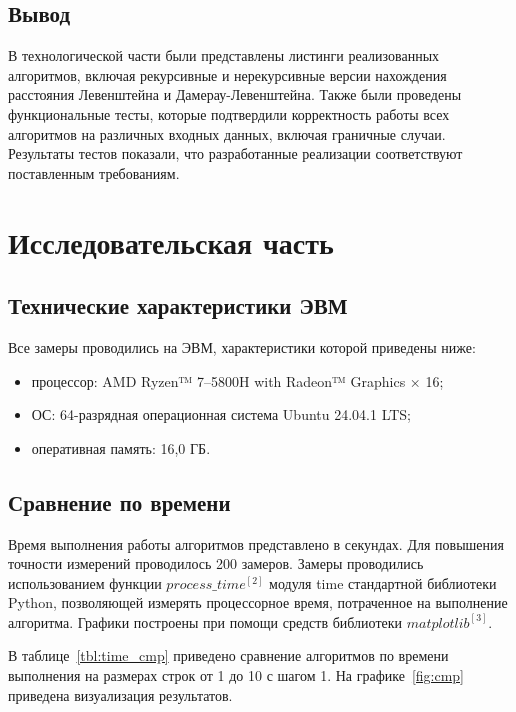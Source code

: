 \documentclass[a4paper, 14pt]{extreport}
\begin{document}
    \section*{Вывод}

    В технологической части были представлены листинги реализованных алгоритмов, включая рекурсивные и нерекурсивные версии нахождения расстояния Левенштейна и Дамерау-Левенштейна.
    Также были проведены функциональные тесты, которые подтвердили корректность работы всех алгоритмов на различных входных данных, включая граничные случаи.
    Результаты тестов показали, что разработанные реализации соответствуют поставленным требованиям.

    \clearpage


    \chapter{Исследовательская часть}\label{ch:-}


    \section{Технические характеристики ЭВМ}\label{sec:--2}
    Все замеры проводились на ЭВМ, характеристики которой приведены ниже:
    \begin{itemize}
        \item процессор: AMD Ryzen™ 7--5800H with Radeon™ Graphics × 16;
        \item ОС: 64-разрядная операционная система Ubuntu 24.04.1 LTS;
        \item оперативная память: 16,0 ГБ.
    \end{itemize}


    \section{Сравнение по времени}

    Время выполнения работы алгоритмов представлено в секундах.
    Для повышения точности измерений проводилось 200 замеров.
    Замеры проводились использованием функции $process\_time^{[2]}$ модуля time стандартной библиотеки Python, позволяющей измерять процессорное время, потраченное на выполнение алгоритма.
    Графики построены при помощи средств библиотеки $matplotlib^{[3]}$.

    В таблице~\ref{tbl:time_cmp} приведено сравнение алгоритмов по времени выполнения на размерах строк от 1 до 10 с шагом 1.
    На графике~\ref{fig:cmp} приведена визуализация результатов.
\end{document}

